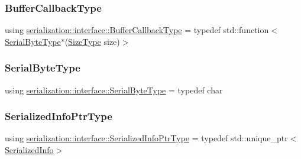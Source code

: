 \subsubsection{\texorpdfstring{Buffer\+Callback\+Type}{BufferCallbackType}}
{\footnotesize\ttfamily using \hyperlink{namespaceserialization_1_1interface_ae1f3fc9ceb0366ab6a877a78ee7377a2}{serialization\+::interface\+::\+Buffer\+Callback\+Type} = typedef std\+::function$<$\hyperlink{namespaceserialization_1_1interface_a718748616a908c35e6080b71d7790a76}{Serial\+Byte\+Type}$\ast$(\hyperlink{namespaceserialization_1_1interface_a2ffaaa9b168f9cbcfe454ab036444403}{Size\+Type} size)$>$}

\mbox{\label{namespaceserialization_1_1interface_a718748616a908c35e6080b71d7790a76}} 
\subsubsection{\texorpdfstring{Serial\+Byte\+Type}{SerialByteType}}
{\footnotesize\ttfamily using \hyperlink{namespaceserialization_1_1interface_a718748616a908c35e6080b71d7790a76}{serialization\+::interface\+::\+Serial\+Byte\+Type} = typedef char}

\mbox{\label{namespaceserialization_1_1interface_ab3413aa784e985f68876637844866ba1}} 
\subsubsection{\texorpdfstring{Serialized\+Info\+Ptr\+Type}{SerializedInfoPtrType}}
{\footnotesize\ttfamily using \hyperlink{namespaceserialization_1_1interface_ab3413aa784e985f68876637844866ba1}{serialization\+::interface\+::\+Serialized\+Info\+Ptr\+Type} = typedef std\+::unique\+\_\+ptr$<$\hyperlink{structserialization_1_1interface_1_1_serialized_info}{Serialized\+Info}$>$}

\mbox{\label{namespaceserialization_1_1interface_a53410d9804c330ddfaf562ddc8e3c681}} 
